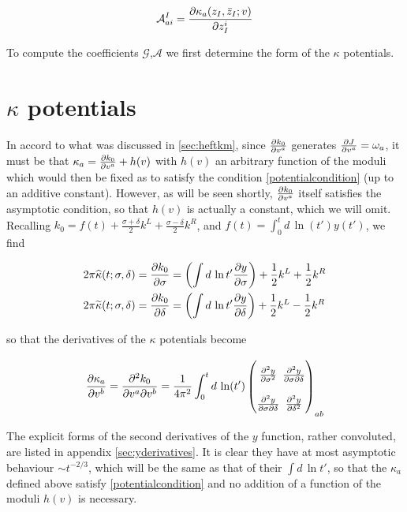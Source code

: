 \begin{equation}
	\mathcal{A}_{ai}^I = \frac{\partial\kappa_a(z_I,\bar z_I; v)}{\partial z_I^i}
	\label{}
\end{equation}

To compute the coefficients $\mathcal{G}$,$\mathcal{A}$ we first determine the form of the $\kappa$ potentials.

\section{$\kappa$ potentials}

In accord to what was discussed in \ref{sec:heftkm}, since $\frac{\partial k_0}{\partial v^a}$ generates $\frac{\partial J}{\partial v^a} = \omega_a$, it must be that $\kappa_a = \frac{\partial k_0}{\partial v^a} + h(v)$ with $h(v)$ an arbitrary function of the moduli which would then be fixed as to satisfy the condition \eqref{potentialcondition} (up to an additive constant). However, as will be seen shortly, $\frac{\partial k_0}{\partial v^a}$ itself satisfies the asymptotic condition, so that $h(v)$ is actually a constant, which we will omit.\\

Recalling $k_0 = f(t) + \frac{\sigma+\delta}{2} k^L + \frac{\sigma-\delta}{2} k^R$, and $f(t) = \int_0^t d \, \ln(t') y(t')$, we find

\begin{align}
 	2\pi \widehat{\kappa}(t;\sigma,\delta) =	\frac{\partial k_0}{\partial\sigma} & = \left( \int d\, \ln t' \frac{\partial y}{\partial\sigma} \right) + \frac{1}2 k^L + \frac{1}2 k^R \\
	2\pi \widetilde{\kappa}(t;\sigma,\delta) =  \frac{\partial k_0}{\partial\delta} & = \left( \int d\, \ln t' \frac{\partial y}{\partial\delta} \right) + \frac{1}2 k^L - \frac{1}2 k^R
	\label{}
\end{align}

so that the derivatives of the $\kappa$ potentials become

\begin{equation}
\arraycolsep=1.4pt\def\arraystretch{2.2}
\pder{\kappa_a}{v^b} = \frac{\partial^2 k_0}{\partial v^a \partial v^b} = \frac{1}{4 \pi^2} \int_0^t d\, \ln(t')
	\begin{pmatrix}
		\frac{\partial^2 y}{\partial \sigma^2} & \frac{\partial^2 y}{\partial \sigma \partial \delta} \\
		\frac{\partial^2 y}{\partial \sigma\partial \delta} & \frac{\partial^2 y}{\partial \delta^2}
	\end{pmatrix}_{ab}
	\label{}
\end{equation}

The explicit forms of the second derivatives of the $y$ function, rather convoluted, are listed in appendix \ref{sec:yderivatives}. It is clear they have at most asymptotic behaviour $\sim t^{-2/3}$, which will be the same as that of their $\int d\,\ln t'$, so that the $\kappa_a$ defined above satisfy \eqref{potentialcondition} and no addition of a function of the moduli $h(v)$ is necessary.

